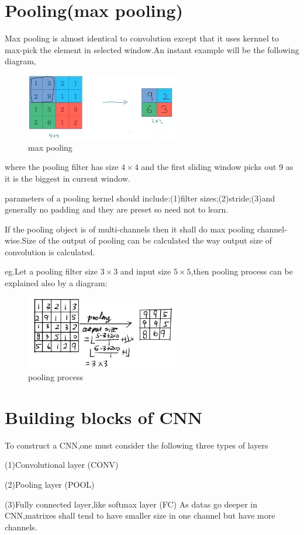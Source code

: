 \documentclass{article}
\begin{document}
\section{Pooling(max pooling)}
Max pooling is almost identical to convolution except that it uses kernnel to max-pick the element in selected window.An instant example will be the following diagram,
\begin{figure}[htbp]
	\centering
	\includegraphics[width=0.6\textwidth]{3.jpg}
	\caption{max pooling}
\end{figure}
where the pooling filter has size $4\times4$ and the first sliding window picks out 9 as it is the biggest in current window.
\par parameters of a pooling kernel should include:(1)filter sizes;(2)stride;(3)and generally no padding and they are preset so need not to learn.
\par If the pooling object is of multi-channels then it shall do max pooling channel-wise.Size of the output of pooling can be calculated the way output size of convolution is calculated.
\par eg.Let a pooling filter size $3\times3$ and input size $5\times5$,then pooling process can be explained also by a diagram:
\begin{figure}[htbp]
	\centering
	\includegraphics[width=0.6\textwidth]{4.jpg}
	\caption{pooling process}
\end{figure}
\section{Building blocks of CNN}
To construct a CNN,one must consider the following three types of layers
\par (1)Convolutional layer (CONV)
\par (2)Pooling layer (POOL)
\par (3)Fully connected layer,like softmax layer (FC) 
As datas go deeper in CNN,matrixes shall tend to have smaller size in one channel but have more channels.
\end{document}
